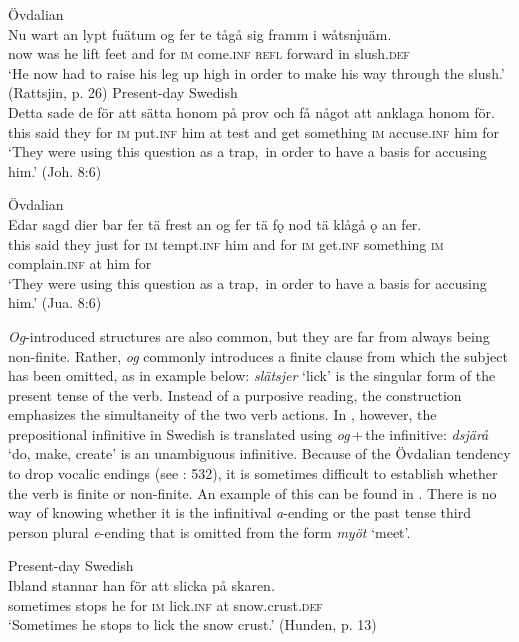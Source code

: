\documentclass[output=paper]{langscibook}
\begin{document}
\ex Övdalian\\\label{ex:kalm:15b}
\gll Nu wart an lypt fuätum og fer te tågå sig framm i wåtsn\k{i}uäm.\\
now was he lift feet and for \textsc{im} come.\textsc{inf} \textsc{refl} forward in slush.\textsc{def}\\
\glt ‘He now had to raise his leg up high in order to make his way through the slush.’ (Rattsjin, p. 26)
\z 
\ex
\label{ex:kalm:16}
\ea Present-day Swedish\\\label{ex:kalm:16a}
\gll Detta sade de för att sätta honom på prov och få något att anklaga honom för.\\
this said they for \textsc{im} put.\textsc{inf} him at test and get something \textsc{im} accuse.\textsc{inf} him for\\
\glt ‘They were using this question as a trap,{~}in order to have a basis for accusing him.’ (Joh. 8:6)

\ex Övdalian\\\label{ex:kalm:16b}
\gll Edar sagd dier bar fer tä frest an og fer tä fǫ nod tä klågå ǫ an fer.\\
this said they just for \textsc{im} tempt.\textsc{inf} him and for \textsc{im} get.\textsc{inf} something \textsc{im} complain.\textsc{inf} at him for\\
\glt ‘They were using this question as a trap,{~}in order to have a basis for accusing him.’ (Jua. 8:6)
\z 
\z 

\textit{Og}-introduced structures are also common, but they are far from always being non-finite. Rather, \textit{og} commonly introduces a finite clause from which the subject has been omitted, as in example  below: \textit{slätsjer} ‘lick’ is the singular form of the present tense of the verb. Instead of a purposive reading, the construction emphasizes the simultaneity of the two verb actions. In , however, the prepositional infinitive in Swedish is translated using \textit{og}\,+\,the infinitive: \textit{dsjärå} ‘do, make, create’ is an unambiguous infinitive. Because of the Övdalian tendency to drop vocalic endings (see \citealt{AkerbergNystrom2012}: 532), it is sometimes difficult to establish whether the verb is finite or non-finite. An example of this can be found in . There is no way of knowing whether it is the infinitival \textit{a}{}-ending or the past tense third person plural \textit{e}{}-ending that is omitted from the form \textit{myöt} ‘meet’. 


\ea
\label{ex:kalm:17}
\ea Present-day Swedish\label{ex:kalm:17a}\\
\gll Ibland stannar han för att slicka på skaren.\\
sometimes stops he for \textsc{im} lick.\textsc{inf} at snow.crust.\textsc{def}\\
\glt ‘Sometimes he stops to lick the snow crust.’ (Hunden, p. 13)
\end{document}
